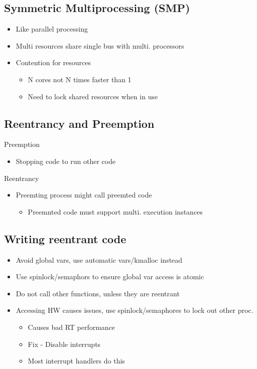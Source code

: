 \subsection{Symmetric Multiprocessing (SMP)}

\begin{itemize}
	\item Like parallel processing
	\item Multi resources share single bus with multi. processors
	\item Contention for resources
	\begin{itemize}
		\item N cores not N times faster than 1
		\item Need to lock shared resources when in use
	\end{itemize}
\end{itemize}

\subsection{Reentrancy and Preemption}

Preemption
\begin{itemize}
	\item Stopping code to run other code
\end{itemize}

Reentrancy
\begin{itemize}
	\item Preemting process might call preemted code
	\begin{itemize}
		\item Preemnted code must support multi. execution instances
	\end{itemize}
\end{itemize}

\subsection{Writing reentrant code}

\begin{itemize}
	\item Avoid global vars, use automatic vars/kmalloc instead
	\item Use spinlock/semaphors to ensure global var access is atomic
	\item Do not call other functions, unless they are reentrant
	\item Accessing HW causes issues, use spinlock/semaphores to lock out
		other proc.
	\begin{itemize}
		\item Causes bad RT performance
		\item Fix - Disable interrupts
		\item Most interrupt handlers do this
	\end{itemize}
\end{itemize}

